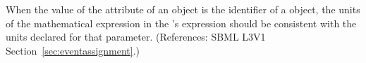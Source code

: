 When the value of the attribute  of an \EventAssignment
object is the identifier of a \Parameter object, the units of the
mathematical expression in the \EventAssignment's  expression
should be consistent with the units declared for that parameter.
(References: SBML L3V1 Section~\ref{sec:eventassignment}.)
